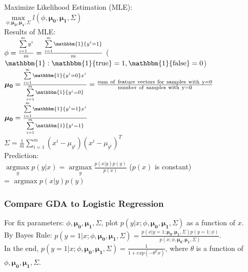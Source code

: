 \documentclass{article}
\begin{document}
\noindent
Maximize Likelihood Estimation (MLE):\\
$\max\limits_{\phi,\boldsymbol{\mu_0},\boldsymbol{\mu_1},\Sigma}l(\phi,\boldsymbol{\mu_0},\boldsymbol{\mu_1},\Sigma)$\\
Results of MLE:\\
$\phi = \frac{\sum\limits_{i=1}^m y^i}{m} = \frac{\sum\limits_{i=1}^m \mathbbm{1}\{y^i=1\}}{m}$ ($\mathbbm{1}: \mathbbm{1}\{{\rm true}\} = 1, \mathbbm{1}\{{\rm false}\} = 0$)\\
$\boldsymbol{\mu_0} = \frac{\sum\limits_{i=1}^m \mathbbm{1}\{y^i=0\}x^i}{\sum\limits_{i=1}^m \mathbbm{1}\{y^i=0\}} = \frac{{\rm sum\ of\ feature\ vectors\ for\ samples\ with\ y=0}}{{\rm number\ of\ samples\ with\ y=0}}$\\
$\boldsymbol{\mu_0} = \frac{\sum\limits_{i=1}^m \mathbbm{1}\{y^i=1\}x^i}{\sum\limits_{i=1}^m \mathbbm{1}\{y^i=1\}}$\\
$\Sigma = \frac{1}{m} \sum\limits_{i=1}^m(x^i-\mu_{y^i})(x^i-\mu_{y^i})^T$\\

\noindent
Prediction:\\
$\mathop{\arg\max}\limits_{y}p(y|x) = \mathop{\arg\max}\limits_{y}\frac{p(x|y)p(y)}{p(x)}$ ($p(x)$ is constant)\\
= $\mathop{\arg\max}p(x|y)p(y)$

\subsubsection{Compare GDA to Logistic Regression}
For fix parameters: $\phi,\boldsymbol{\mu_0}, \boldsymbol{\mu_1}, \Sigma$, 
plot $p(y|x; \phi,\boldsymbol{\mu_0},\boldsymbol{\mu_1},\Sigma)$ as a function of $x$.\\
By Bayes Rule: $p(y=1|x; \phi,\boldsymbol{\mu_0},\boldsymbol{\mu_1},\Sigma) = \frac{p(x|y=1;\boldsymbol{\mu_0},\boldsymbol{\mu_1},\Sigma)p(y=1;\phi)}{p(x; \phi,\boldsymbol{\mu_0},\boldsymbol{\mu_1},\Sigma)}$.\\
In the end, $p(y=1|x;\phi,\boldsymbol{\mu_0},\boldsymbol{\mu_1},\Sigma) = \frac{1}{1+exp(-\theta^Tx)}$, where $\theta$ is a function of $\phi,\boldsymbol{\mu_0},\boldsymbol{\mu_1},\Sigma$.\\
\end{document}
